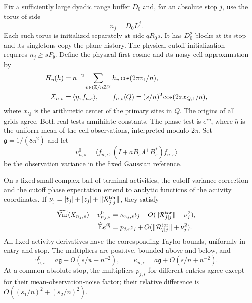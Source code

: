 Fix a sufficiently large dyadic range buffer $D_0$ and, for an absolute
stop $j$, use the torus of side
\begin{equation}\label{eq:stopping-tori}
                              n_j=D_0L^j.
\end{equation}
Each such torus is initialized separately at side $qR_0s$.  It has
$D_0^2$ blocks at its stop and its singletons copy the plane history.
The physical cutoff initialization requires $n_j\ge sP_0$.
Define the physical first cosine and its noisy-cell approximation by
\begin{equation}\label{eq:physical-cosine}
 \begin{split}
 H_n(h)&=n^{-2}\sum_{v\in(\mathbb Z/n\mathbb Z)^2}h_v\cos(2\pi v_1/n),\\
 X_{n,s}&=\langle\eta,f_{n,s}\rangle,
 \qquad f_{n,s}(Q)=(s/n)^2\cos(2\pi x_{Q,1}/n),
 \end{split}
\end{equation}
where $x_Q$ is the arithmetic center of the primary sites in $Q$.
The origins of all grids agree.  Both real tests annihilate constants.
The phase test is $e^{i\bar\eta}$, where $\bar\eta$ is the uniform
mean of the cell observations, interpreted modulo $2\pi$.
Set $\mathfrak g=1/(8\pi^2)$ and let
\[
 v^0_{n,s}=\langle f_{n,s},(I+aB_sA^+B_s^*)f_{n,s}\rangle
\]
be the observation variance in the fixed Gaussian reference.

\begin{proposition}\label{prop:readouts}
On a fixed small complex ball of terminal activities, the cutoff
variance correction and the cutoff phase expectation extend to analytic
functions of the activity coordinates.  If
$\nu_j=|t_j|+|z_j|+\|\mathcal R^{\rm tor}_{j|j}\|$, they satisfy
\begin{equation}\label{eq:torus-readouts}
 \begin{split}
 \widehat{\operatorname{Var}}(X_{n_j,s})-v^0_{n_j,s}
      &=\kappa_{n_j,s}t_j+O(\|\mathcal R^{\rm tor}_{j|j}\|+\nu_j^2),\\
 \widehat{\mathbb E} e^{i\bar\eta}
      &=p_{j,s}z_j+O(\|\mathcal R^{\rm tor}_{j|j}\|+\nu_j^2).
 \end{split}
\end{equation}
All fixed activity derivatives have the corresponding Taylor bounds,
uniformly in entry and stop.  The multipliers are positive, bounded
above and below, and
\begin{equation}\label{eq:readout-multipliers}
 v^0_{n,s}=a\mathfrak g+O(s/n+n^{-2}),\qquad
 \kappa_{n,s}=a\mathfrak g+O(s/n+n^{-2}).
\end{equation}
At a common absolute stop, the multipliers $p_{j,s}$ for different
entries agree except for their mean-observation-noise factor; their
relative difference is $O((s_1/n)^2+(s_2/n)^2)$.
\end{proposition}

